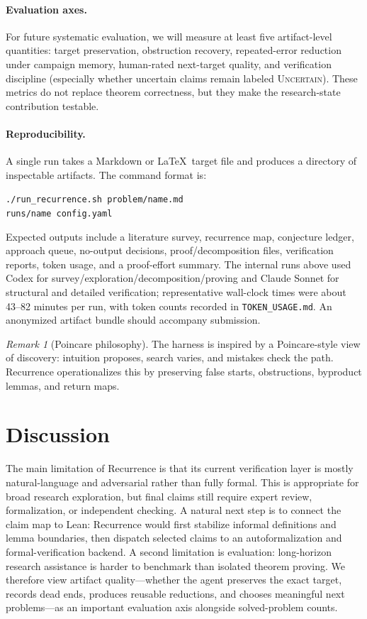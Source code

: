 \documentclass{article}
\theoremstyle{definition}
\theoremstyle{remark}
\newtheorem{remark}{Remark}
\begin{document}
\paragraph{Evaluation axes.}
For future systematic evaluation, we will measure at least five artifact-level quantities: target preservation, obstruction recovery, repeated-error reduction under campaign memory, human-rated next-target quality, and verification discipline (especially whether uncertain claims remain labeled \textsc{Uncertain}). These metrics do not replace theorem correctness, but they make the research-state contribution testable.

\paragraph{Reproducibility.}
A single run takes a Markdown or \LaTeX\ target file and produces a directory of inspectable artifacts. The command format is:
\begin{center}
\footnotesize\texttt{./run\_recurrence.sh problem/name.md}\\
\footnotesize\texttt{runs/name config.yaml}
\end{center}
Expected outputs include a literature survey, recurrence map, conjecture ledger, approach queue, no-output decisions, proof/decomposition files, verification reports, token usage, and a proof-effort summary. The internal runs above used Codex for survey/exploration/decomposition/proving and Claude Sonnet for structural and detailed verification; representative wall-clock times were about 43--82 minutes per run, with token counts recorded in \texttt{TOKEN\_USAGE.md}. An anonymized artifact bundle should accompany submission.

\begin{remark}[Poincare philosophy]
The harness is inspired by a Poincare-style view of discovery: intuition proposes, search varies, and mistakes check the path. Recurrence operationalizes this by preserving false starts, obstructions, byproduct lemmas, and return maps.
\end{remark}

\section{Discussion}

The main limitation of Recurrence is that its current verification layer is mostly natural-language and adversarial rather than fully formal. This is appropriate for broad research exploration, but final claims still require expert review, formalization, or independent checking. A natural next step is to connect the claim map to Lean: Recurrence would first stabilize informal definitions and lemma boundaries, then dispatch selected claims to an autoformalization and formal-verification backend. A second limitation is evaluation: long-horizon research assistance is harder to benchmark than isolated theorem proving. We therefore view artifact quality---whether the agent preserves the exact target, records dead ends, produces reusable reductions, and chooses meaningful next problems---as an important evaluation axis alongside solved-problem counts.
\end{document}

